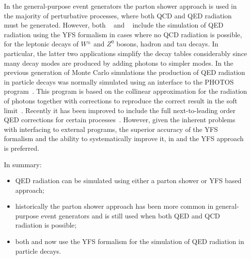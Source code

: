 In the general-purpose event generators the parton shower
approach is used in the majority of perturbative processes, where
both QCD and QED radiation must be generated. However, both
\herwigpp~\cite{Hamilton:2006xz} and \sherpa~\cite{Schonherr:2008av}
include the simulation of QED radiation using the YFS formalism
in cases where no QCD radiation is possible, \ie
for the leptonic decays of $W^\pm$ and $Z^0$ bosons, hadron and tau decays. 
In particular, the latter two applications simplify the decay tables
considerably since many decay modes are produced by adding photons to
simpler modes.
In the previous generation of Monte Carlo simulations the production
of QED radiation in particle decays was normally simulated using an interface to the PHOTOS 
program~\cite{Barberio:1993qi,Barberio:1990ms,Golonka:2005pn}. This program
is based on the collinear approximation for the radiation of 
photons together with corrections to reproduce the correct result in the soft
limit~\cite{Barberio:1993qi,Barberio:1990ms}. Recently it has been improved 
to include the full next-to-leading order QED corrections for certain 
processes~\cite{Golonka:2005pn}. However, given the inherent problems
with interfacing to external programs, the superior accuracy of the YFS
formalism and the ability to systematically improve it, 
in \herwigpp and \sherpa the YFS approach is preferred.

In summary:
\begin{itemize}
\item QED radiation can be simulated using either a parton shower or
      YFS based approach;
\item historically the parton shower approach has been more common in
      general-purpose event generators and is still used when both QED and
      QCD radiation is possible;
\item both \herwigpp and
      \sherpa now use the YFS formalism for the simulation of
      QED radiation in particle decays.
\end{itemize}
